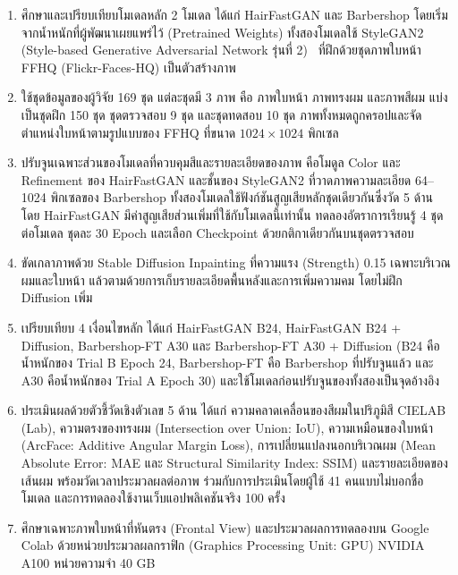 \begin{enumerate}
    \item ศึกษาและเปรียบเทียบโมเดลหลัก 2 โมเดล ได้แก่ HairFastGAN และ Barbershop
    โดยเริ่มจากน้ำหนักที่ผู้พัฒนาเผยแพร่ไว้ (Pretrained Weights)
    ทั้งสองโมเดลใช้ StyleGAN2 (Style-based Generative Adversarial Network รุ่นที่ 2)~\cite{karras2020analyzingimprovingimagequality}
    ที่ฝึกด้วยชุดภาพใบหน้า FFHQ (Flickr-Faces-HQ) เป็นตัวสร้างภาพ
    \item ใช้ชุดข้อมูลของผู้วิจัย 169 ชุด แต่ละชุดมี 3 ภาพ คือ ภาพใบหน้า ภาพทรงผม และภาพสีผม
    แบ่งเป็นชุดฝึก 150 ชุด ชุดตรวจสอบ 9 ชุด และชุดทดสอบ 10 ชุด
    ภาพทั้งหมดถูกครอปและจัดตำแหน่งใบหน้าตามรูปแบบของ FFHQ ที่ขนาด $1024 \times 1024$ พิกเซล
    \item ปรับจูนเฉพาะส่วนของโมเดลที่ควบคุมสีและรายละเอียดของภาพ
    คือโมดูล Color และ Refinement ของ HairFastGAN
    และชั้นของ StyleGAN2 ที่วาดภาพความละเอียด 64--1024 พิกเซลของ Barbershop
    ทั้งสองโมเดลใช้ฟังก์ชันสูญเสียหลักชุดเดียวกันซึ่งวัด 5 ด้าน
    โดย HairFastGAN มีค่าสูญเสียส่วนเพิ่มที่ใช้กับโมเดลนี้เท่านั้น
    ทดลองอัตราการเรียนรู้ 4 ชุดต่อโมเดล ชุดละ 30 Epoch
    และเลือก Checkpoint ด้วยกติกาเดียวกันบนชุดตรวจสอบ
    \item ขัดเกลาภาพด้วย Stable Diffusion Inpainting ที่ความแรง (Strength) 0.15
    เฉพาะบริเวณผมและใบหน้า แล้วตามด้วยการเก็บรายละเอียดพื้นหลังและการเพิ่มความคม
    โดยไม่ฝึก Diffusion เพิ่ม
    \item เปรียบเทียบ 4 เงื่อนไขหลัก ได้แก่ HairFastGAN B24, HairFastGAN B24 + Diffusion,
    Barbershop-FT A30 และ Barbershop-FT A30 + Diffusion
    (B24 คือน้ำหนักของ Trial B Epoch 24, Barbershop-FT คือ Barbershop ที่ปรับจูนแล้ว
    และ A30 คือน้ำหนักของ Trial A Epoch 30)
    และใช้โมเดลก่อนปรับจูนของทั้งสองเป็นจุดอ้างอิง
    \item ประเมินผลด้วยตัวชี้วัดเชิงตัวเลข 5 ด้าน ได้แก่ ความคลาดเคลื่อนของสีผมในปริภูมิสี CIELAB (Lab),
    ความตรงของทรงผม (Intersection over Union: IoU), ความเหมือนของใบหน้า (ArcFace: Additive Angular Margin Loss),
    การเปลี่ยนแปลงนอกบริเวณผม (Mean Absolute Error: MAE และ Structural Similarity Index: SSIM)
    และรายละเอียดของเส้นผม พร้อมวัดเวลาประมวลผลต่อภาพ
    ร่วมกับการประเมินโดยผู้ใช้ 41 คนแบบไม่บอกชื่อโมเดล
    และการทดลองใช้งานเว็บแอปพลิเคชันจริง 100 ครั้ง
    \item ศึกษาเฉพาะภาพใบหน้าที่หันตรง (Frontal View)
    และประมวลผลการทดลองบน Google Colab ด้วยหน่วยประมวลผลกราฟิก (Graphics Processing Unit: GPU) NVIDIA A100 หน่วยความจำ 40 GB
\end{enumerate}

